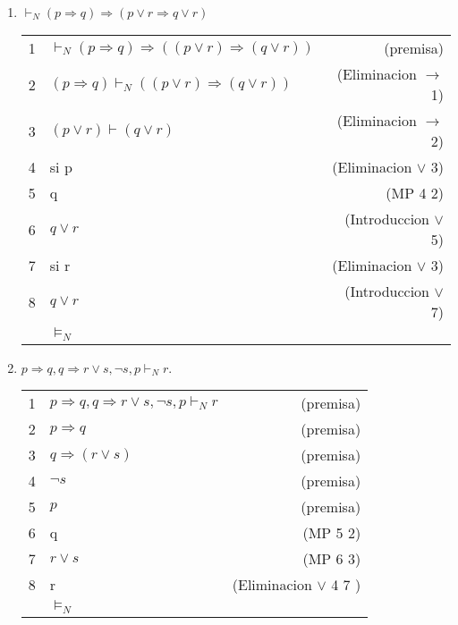 \documentclass[10pt,letterpaper,fleqn]{article}
\begin{document}
\begin{enumerate}
\begin{enumerate}
            \item \textbf{$\vdash_N (p \Rightarrow q) \Rightarrow (p \vee r \Rightarrow q \vee r)$}
            \\\begin{tabular}{l l r}
                   1  & $\vdash_N (p \Rightarrow q) \Rightarrow ((p \vee r) \Rightarrow (q \vee r)) $ & (premisa)
                \\ 2  & $(p \Rightarrow q) \vdash_N ((p \vee r) \Rightarrow (q \vee r)) $& (Eliminacion $\rightarrow$ 1)
                \\3  & $ (p \vee r ) \vdash (q \vee r) $ &(Eliminacion $\rightarrow$ 2)
                \\4  & si p &(Eliminacion $\vee$ 3)
                \\5  & q  &(MP 4 2)
                \\6  & $q \vee r $  &(Introduccion $\vee$ 5)
                \\7  & si r &(Eliminacion $\vee$ 3)
                \\8  & $q \vee r $  &(Introduccion $\vee$ 7)
                \\& $\vDash_N$
            \end{tabular}
            
            \item \textbf{$p \Rightarrow q, q \Rightarrow r \vee s, \neg s, p \vdash_N  r.$}
            \\\begin{tabular}{l l r}
                   1  & $p \Rightarrow q, q \Rightarrow r \vee s, \neg s, p \vdash_N  r$ & (premisa)
                \\ 2  &$p \Rightarrow q $ & (premisa)
                \\ 3  & $q \Rightarrow (r \vee s)$ & (premisa)
                \\ 4  & $\neg s $ & (premisa)
                \\ 5  & $ p $ & (premisa)
                \\ 6  & q & (MP 5 2)
                \\ 7  & $r \vee s $& (MP 6 3)
                \\ 8  & r& (Eliminacion $\vee$ 4 7 )
                \\& $\vDash_N$
            \end{tabular}
        \end{enumerate}
        

\end{enumerate}
\end{document}
